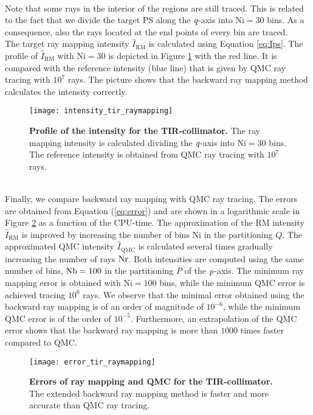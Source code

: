 \\ \indent Note that some rays in the interior of the regions are still traced. This is related to the fact that we divide the target PS along the $\textit{q}$-axis into $\textrm{Ni}=30$ bins. As a consequence, also the rays located at the end points of every bin are traced. \\
\indent The target ray mapping intensity $\hat{I}_{\textrm{RM}}$ is calculated using Equation \ref{eq:Ips}. The profile of $\hat{I}_{\textrm{RM}}$ with $\textrm{Ni}=30$ is depicted in Figure \ref{fig:intensity_tir_raymapping} with the red line. It is compared with the reference intensity (blue line) that is given by QMC ray tracing with $10^7$ rays. The picture shows that the backward ray mapping method calculates the intensity correctly.
\begin{figure}[t]
  \begin{center}
  \texttt{[image: intensity\_tir\_raymapping]}
  \end{center}
  \caption{\textbf{Profile of the intensity for the TIR-collimator.}
 The ray mapping intensity is calculated dividing the $\textit{q}$-axis into $\textrm{Ni}=30$ bins. The reference intensity is obtained from QMC ray tracing with $10^7$ rays.}
\label{fig:intensity_tir_raymapping}
 \end{figure}
\\ \indent 
Finally, we compare backward ray mapping with QMC ray tracing. The errors are obtained from Equation (\ref{eq:error}) and are shown in a logarithmic scale in Figure \ref{fig:error_tir_raymapping} as a function of the CPU-time. The approximation of the RM intensity $\hat{I}_{\textrm{RM}}$ is improved by increasing the number of bins $\textrm{Ni}$ in the partitioning $Q$. The approximated QMC intensity $\hat{I}_{\textrm{QMC}}$ is calculated several times gradually increasing the number of rays $\textrm{Nr}$. Both intensities are computed using the same number of bins, $\textrm{Nb}=100$ in the partitioning $P$ of the $\textit{p}$-axis. The minimum ray mapping error is obtained with $\textrm{Ni}=100$ bins, while the minimum QMC error is achieved tracing $10^6$ rays. We observe that the minimal error obtained using the backward ray mapping is of an order of magnitude of $10^{-6}$, while the minimum QMC error is of the order of $10^{-5}$. Furthermore, an extrapolation of the QMC error shows that the backward ray mapping is more than $1000$ times faster compared to QMC.
\begin{figure}[t]
  \begin{center}
  \texttt{[image: error\_tir\_raymapping]}
  \end{center}
  \caption{\textbf{Errors of ray mapping and QMC for the TIR-collimator.}
 The extended backward ray mapping method is faster and more accurate than QMC ray tracing.}
\label{fig:error_tir_raymapping}
 \end{figure}
